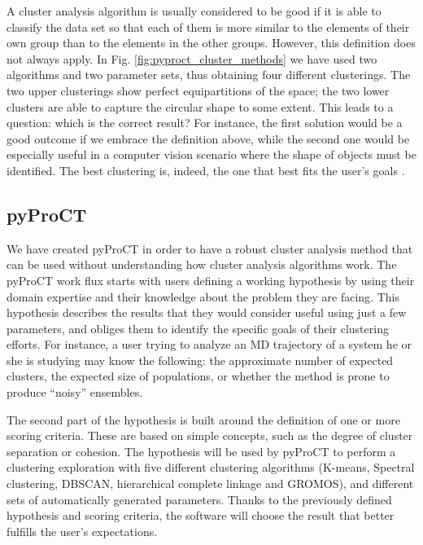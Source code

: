 A cluster analysis algorithm is usually considered to be good if it is able to classify the data set so that each of
them is more similar to the elements of their own group than to the elements in the other groups. However, this
definition does not always apply. In Fig. \ref{fig:pyproct_cluster_methods} we have used two
algorithms and two parameter sets, thus obtaining four different clusterings. The two upper clusterings show perfect
equipartitions of the space; the two lower clusters are able to capture the circular shape to some extent. This leads to a question: which is the correct result? For instance, the first solution would be a good outcome if we embrace the definition above, while the second one would be especially useful in a computer vision scenario where the shape of objects must be identified. The best clustering is, indeed, the one that best fits the user's goals
\cite{luxburg_tutorial_2007}.

\subsection{pyProCT}

We have created pyProCT
\cite{gil_pyproct_2014-1} in order to have a robust cluster analysis method that can be used without understanding how cluster analysis algorithms work. The pyProCT work flux starts with users defining a working hypothesis by using their domain expertise and their knowledge about the problem they are facing. This hypothesis describes the results that they would consider useful using just a few
parameters, and obliges  them to identify the specific goals of their clustering efforts. For instance, a user trying to analyze an MD trajectory of a system he or she is studying may know the following: the approximate number of expected clusters, the expected size of populations, or whether the method is prone to produce ``noisy'' ensembles. 

The second part of the hypothesis is built around the definition of one or more scoring criteria. These are based on simple concepts, such as the degree of cluster separation or cohesion. The hypothesis will be used by pyProCT to perform a clustering exploration with five different clustering algorithms (K-means, Spectral clustering, DBSCAN, hierarchical complete linkage and GROMOS), and different sets of automatically generated parameters. Thanks to
the previously defined hypothesis and scoring criteria, the software will choose the result that better fulfills the user's expectations.

